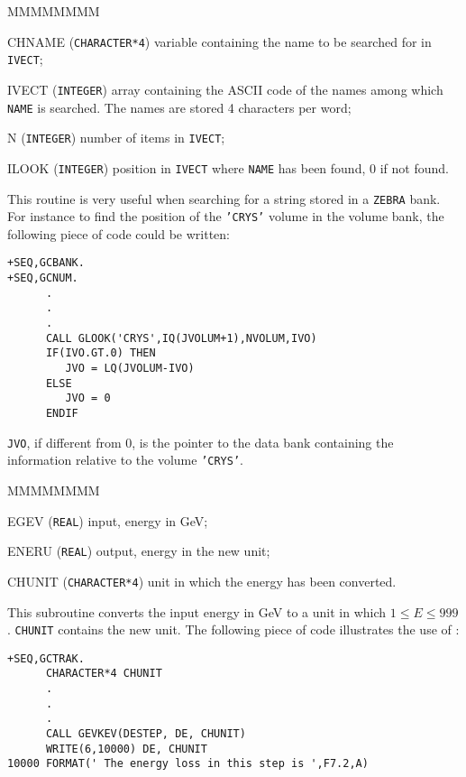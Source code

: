   
 
\begin{DLtt}{MMMMMMMM}
\item[CHNAME]({\tt CHARACTER*4}) variable containing the name to be
searched for in {\tt IVECT};
\item[IVECT] ({\tt INTEGER}) array containing the ASCII code of the 
names among which
{\tt NAME} is searched. The names are stored 4 characters per word;
\item[N]({\tt INTEGER}) number of items in {\tt IVECT};
\item[ILOOK]({\tt INTEGER}) position in {\tt IVECT} where {\tt NAME} has
been found, 0 if not found.
\end{DLtt}

This routine is very useful when searching for a string stored 
in a {\tt ZEBRA} bank. For instance to find the
position of the {\tt 'CRYS'} volume in the volume bank, the following
piece of code could be written:

\begin{verbatim}
+SEQ,GCBANK.
+SEQ,GCNUM.
      .
      .
      .
      CALL GLOOK('CRYS',IQ(JVOLUM+1),NVOLUM,IVO)
      IF(IVO.GT.0) THEN
         JVO = LQ(JVOLUM-IVO)
      ELSE
         JVO = 0
      ENDIF
\end{verbatim}

{\tt JVO}, if different from 0, is the pointer to the data
bank containing the information relative to the volume {\tt 'CRYS'}.

\begin{DLtt}{MMMMMMMM}
\item[EGEV] ({\tt REAL}) input, energy in GeV;
\item[ENERU] ({\tt REAL}) output, energy in the new unit;
\item[CHUNIT] ({\tt CHARACTER*4}) unit in which the energy has been converted.
\end{DLtt}

This subroutine converts the input energy in GeV to a unit in which 
$1 \leq E \leq 999$. {\tt CHUNIT} contains the new
unit. The following piece of code illustrates the use of :
\begin{verbatim}
+SEQ,GCTRAK.
      CHARACTER*4 CHUNIT
      .
      .
      .
      CALL GEVKEV(DESTEP, DE, CHUNIT)
      WRITE(6,10000) DE, CHUNIT
10000 FORMAT(' The energy loss in this step is ',F7.2,A)
\end{verbatim}

